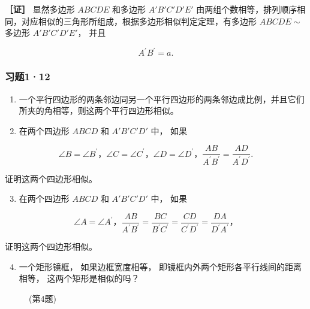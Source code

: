 \textbf{［证］} 显然多边形 \(ABCDE\) 和多边形 \(A'B'C'D'E'\)
由两组个数相等，排列顺序相同，对应相似的三角形所组成，根据多边形相似判定定理，有多边形
\(ABCDE \sim\) 多边形 \(A'B'C'D'E'\)， 并且

\[
A ^ {\prime} B ^ {\prime} = a.
\]

\subsubsection{习题1·12}

\begin{enumerate}
\item
  一个平行四边形的两条邻边同另一个平行四边形的两条邻边成比例，并且它们所夹的角相等，则这两个平行四边形相似。
\item
  在两个四边形 \(ABCD\) 和 \(A'B'C'D'\) 中， 如果
\end{enumerate}

\[
\angle B = \angle B ^ {\prime}\text{，} \angle C = \angle C ^ {\prime}\text{，} \angle D = \angle D ^ {\prime}\text{，} \frac {A B}{A ^ {\prime} B ^ {\prime}} = \frac {A D}{A ^ {\prime} D ^ {\prime}}.
\]

证明这两个四边形相似。

\begin{enumerate}
\setcounter{enumi}{2}
\item
  在两个四边形 \(ABCD\) 和 \(A'B'C'D'\) 中， 如果
\end{enumerate}

\[
\angle A = \angle A ^ {\prime}\text{，} \frac {A B}{A ^ {\prime} B ^ {\prime}} = \frac {B C}{B ^ {\prime} C ^ {\prime}} = \frac {C D}{C ^ {\prime} D ^ {\prime}} = \frac {D A}{D ^ {\prime} A ^ {\prime}}\text{，}
\]

证明这两个四边形相似。

\begin{enumerate}
\setcounter{enumi}{3}
\item
  一个矩形镜框， 如果边框宽度相等，
  即镜框内外两个矩形各平行线间的距离相等， 这两个矩形是相似的吗？
\end{enumerate}

\begin{figure}
\centering
{}
\caption{(第4题)}
\end{figure}

